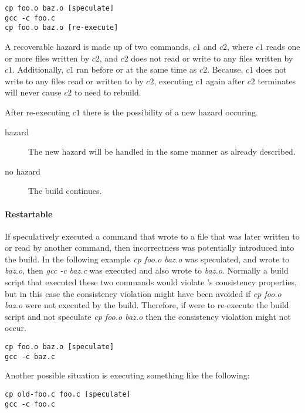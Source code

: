 \begin{verbatim}
cp foo.o baz.o [speculate]
gcc -c foo.c
cp foo.o baz.o [re-execute]
\end{verbatim}

A recoverable hazard is made up of two commands, $c1$ and $c2$, where $c1$ reads one or more files written by $c2$, and $c2$ does not read or write to any files written by $c1$.  Additionally, $c1$ ran before or at the same time as $c2$.  Because, $c1$ does not write to any files read or written to by $c2$, executing $c1$ again after $c2$ terminates will never cause $c2$ to need to rebuild.

After re-executing $c1$ there is the possibility of a new hazard occuring. 
\begin{description}
\item[hazard] The new hazard will be handled in the same manner as already described.
\item[no hazard] The build continues.
\end{description}

\paragraph{Restartable} %
If \Rattle speculatively executed a command that wrote to a file that was later written to or read by another command, then incorrectness was potentially introduced into the build.  In the following example \emph{cp foo.o baz.o} was speculated, and wrote to \emph{baz.o}, then \emph{gcc -c baz.c} was executed and also wrote to \emph{baz.o}.  Normally a build script that executed these two commands would violate \Rattle's consistency properties, but in this case the consistency violation might have been avoided if \emph{cp foo.o baz.o} were not executed by the build.  Therefore, if \Rattle were to re-execute the build script and not speculate \emph{cp foo.o baz.o} then the consistency violation might not occur.

\begin{verbatim}
cp foo.o baz.o [speculate]
gcc -c baz.c
\end{verbatim}

Another possible situation is \Rattle executing something like the following:

\begin{verbatim}
cp old-foo.c foo.c [speculate]
gcc -c foo.c
\end{verbatim}

